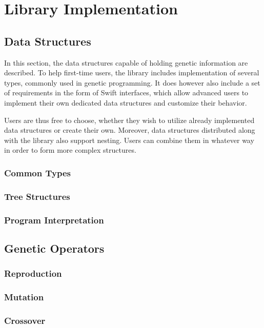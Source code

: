 \chapter{Library Implementation}
\todo

\section{Data Structures}
In this section, the data structures capable of holding genetic information are described. To help first-time users, the library includes implementation of several types, commonly used in genetic programming. It does however also include a set of requirements in the form of Swift interfaces, which allow advanced users to implement their own dedicated data structures and customize their behavior.

Users are thus free to choose, whether they wish to utilize already implemented data structures or create their own. Moreover, data structures distributed along with the library also support nesting. Users can combine them in whatever way in order to form more complex structures.


\subsection{Common Types}
\todo

\subsection{Tree Structures}
\todo

\subsection{Program Interpretation}
\todo

\section{Genetic Operators}
\todo

\subsection{Reproduction}
\todo

\subsection{Mutation}
\todo

\subsection{Crossover}
\todo

